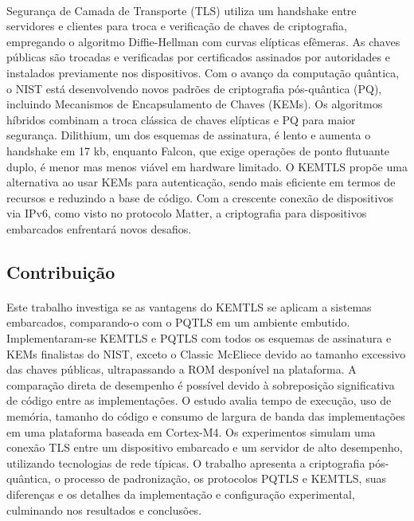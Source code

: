 \documentclass[letterpaper,11pt,leqno]{article}
\begin{document}
\paragraph{}
Segurança de Camada de Transporte (TLS) utiliza um handshake entre servidores
e clientes para troca e verificação de chaves de criptografia, empregando o
algoritmo Diffie-Hellman com curvas elípticas efêmeras. As chaves públicas são
trocadas e verificadas por certificados assinados por autoridades e instalados
previamente nos dispositivos. Com o avanço da computação quântica, o NIST está
desenvolvendo novos padrões de criptografia pós-quântica (PQ), incluindo
Mecanismos de Encapsulamento de Chaves (KEMs). Os algoritmos híbridos combinam a
troca clássica de chaves elípticas e PQ para maior segurança. Dilithium, um dos
esquemas de assinatura, é lento e aumenta o handshake em 17 kb, enquanto Falcon,
que exige operações de ponto flutuante duplo, é menor mas menos viável em
hardware limitado. O KEMTLS propõe uma alternativa ao usar KEMs para
autenticação, sendo mais eficiente em termos de recursos e reduzindo a base de
código. Com a crescente conexão de dispositivos via IPv6, como visto no
protocolo Matter, a criptografia para dispositivos embarcados enfrentará novos
desafios.

\subsection{Contribuição}

\paragraph{}
Este trabalho investiga se as vantagens do KEMTLS se aplicam a sistemas
embarcados, comparando-o com o PQTLS em um ambiente embutido. Implementaram-se
KEMTLS e PQTLS com todos os esquemas de assinatura e KEMs finalistas do NIST,
exceto o Classic McEliece devido ao tamanho excessivo das chaves públicas,
ultrapassando a ROM desponível na plataforma. A comparação direta de desempenho
é possível devido à sobreposição significativa de código entre as
implementações. O estudo avalia tempo de execução, uso de memória, tamanho do
código e consumo de largura de banda das implementações em uma plataforma
baseada em Cortex-M4. Os experimentos simulam uma conexão TLS entre um
dispositivo embarcado e um servidor de alto desempenho, utilizando tecnologias
de rede típicas. O trabalho apresenta a criptografia pós-quântica, o processo de
padronização, os protocolos PQTLS e KEMTLS, suas diferenças e os detalhes da
implementação e configuração experimental, culminando nos resultados e
conclusões.
\end{document}
